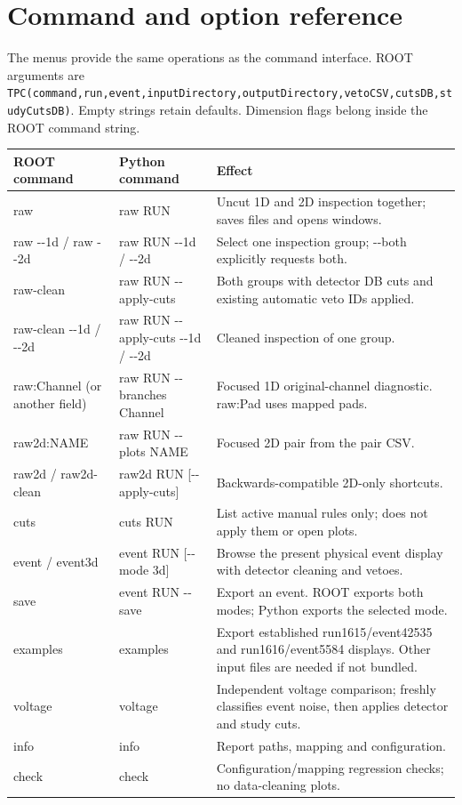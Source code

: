 \documentclass[11pt,a4paper]{article}
\begin{document}
\section{Command and option reference}
The menus provide the same operations as the command interface. ROOT arguments are
\texttt{TPC(command,run,event,inputDirectory,outputDirectory,vetoCSV,cutsDB,studyCutsDB)}.
Empty strings retain defaults. Dimension flags belong inside the ROOT command string.
\begin{longtable}{p{.22\linewidth}p{.27\linewidth}p{.41\linewidth}}
\toprule ROOT command & Python command & Effect \\\midrule
raw & raw RUN & Uncut 1D and 2D inspection together; saves files and opens windows.\\
raw -{}-1d / raw -{}-2d & raw RUN -{}-1d / -{}-2d & Select one inspection group; -{}-both explicitly requests both.\\
raw-clean & raw RUN -{}-apply-cuts & Both groups with detector DB cuts and existing automatic veto IDs applied.\\
raw-clean -{}-1d / -{}-2d & raw RUN -{}-apply-cuts -{}-1d / -{}-2d & Cleaned inspection of one group.\\
raw:Channel (or another field) & raw RUN -{}-branches Channel & Focused 1D original-channel diagnostic. raw:Pad uses mapped pads.\\
raw2d:NAME & raw RUN -{}-plots NAME & Focused 2D pair from the pair CSV.\\
raw2d / raw2d-clean & raw2d RUN [-{}-apply-cuts] & Backwards-compatible 2D-only shortcuts.\\
cuts & cuts RUN & List active manual rules only; does not apply them or open plots.\\
event / event3d & event RUN [-{}-mode 3d] & Browse the present physical event display with detector cleaning and vetoes.\\
save & event RUN -{}-save & Export an event. ROOT exports both modes; Python exports the selected mode.\\
examples & examples & Export established run1615/event42535 and run1616/event5584 displays. Other input files are needed if not bundled.\\
voltage & voltage & Independent voltage comparison; freshly classifies event noise, then applies detector and study cuts.\\
info & info & Report paths, mapping and configuration.\\
check & check & Configuration/mapping regression checks; no data-cleaning plots.\\
\bottomrule
\end{longtable}
\end{document}
